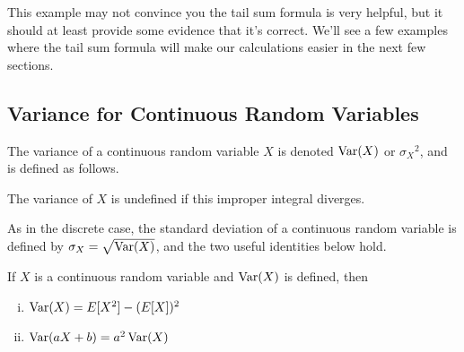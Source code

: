This example may not convince you the tail sum formula is very helpful, but it should at least provide some evidence that it's correct. We'll see a few examples where the tail sum formula will make our calculations easier in the next few sections.


\subsection*{Variance for Continuous Random Variables}

\begin{defn}The variance of a continuous random variable $X$ is denoted $\operatorname{Var}(X)$ or ${\sigma_X}^2$, and is defined as follows.
\par
\noindent The variance of $X$ is undefined if this improper integral diverges.
\end{defn}
\par
As in the discrete case, the standard deviation of a continuous random variable is defined by $\sigma_X = \sqrt{\operatorname{Var}(X)}$, and the two useful identities below hold. 

\begin{prop}If $X$ is a continuous random variable and $\operatorname{Var}(X)$ is defined, then
\vspace{-2em}
\begin{enumerate}[(i)]
\item $\operatorname{Var}(X) = E[X^2] -(E[X])^2$
\item $\operatorname{Var}(aX+b) = a^2\operatorname{Var}(X)$
\end{enumerate}
\end{prop}

